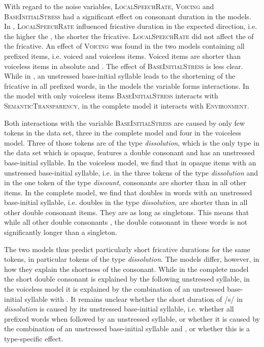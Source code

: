 With regard to the noise variables, \textsc{LocalSpeechRate}, \textsc{Voicing}  and \textsc{BaseInitialStress} had a significant effect on consonant duration in the models. 
In , \textsc{LocalSpeechRate} influenced fricative duration in the expected direction, i.e. the higher the , the shorter the fricative. \textsc{LocalSpeechRate} did not affect the  of the fricative. 
An effect of \textsc{Voicing} was found in the two models containing all prefixed items, i.e. voiced and voiceless items. Voiced items are shorter than voiceless items in absolute and .
The effect of \textsc{BaseInitialStress} is less clear. While in , an unstressed base-initial syllable leads to the shortening of the fricative in all prefixed words, in the  models the variable forms interactions. In the model with only voiceless items \textsc{BaseInitialStress} interacts with \textsc{SemanticTransparency},  in the complete model it interacts with \textsc{Environment}.



Both interactions with the variable \textsc{BaseInitialStress} are caused by only few tokens in the data set, three in the complete model and four in the voiceless model. Three of those tokens are of the type \textit{dissolution}, which is the only type in the data set which is opaque, features a double consonant and has an unstressed base-initial syllable. 
In the voiceless model, we find that in opaque items with an unstressed base-initial syllable, i.e. in the three tokens of the type \textit{dissolution} and in the one token of the type \textit{discount}, consonants are shorter than in all other items. 
In the complete model, we find that doubles in words with an unstressed base-initial syllable, i.e. doubles in the type \textit{dissolution}, are shorter than in all other double consonant items. They are as long as singletons. This means that while all other double consonants , the double consonant in these words is not significantly longer than a singleton.

The two  models thus predict particularly short fricative durations for the same tokens, in particular tokens of the type \textit{dissolution}. The models differ, however, in how they explain the shortness of the consonant. While in the complete model the short double consonant is explained by the following unstressed syllable, in the voiceless model it is explained by the combination of an unstressed base-initial syllable with . It remains unclear whether the short duration of /s/ in \textit{dissolution} is caused by its unstressed base-initial syllable, i.e. whether all prefixed words  when followed by an unstressed syllable, or whether it is caused by the combination of an unstressed base-initial syllable and , or whether this is a type-specific effect.


